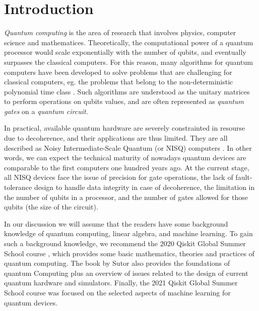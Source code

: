 \section{Introduction} \label{Sec: Introduction}

\emph{Quantum computing} is the area of research that involves physics, computer science and mathematices.
Theoretically, the computational power of a quantum processor would scale exponentially with the number of qubits, and eventually surpasses the classical computers.
For this reason, many algorithms for quantum computers have been developed to solve problems that are challenging for classical computers, eg. the problems that belong to the non-deterministic polynomial time class \cite{williamsSolvingNPCompleteProblems2011,jiangQuantumAnnealingPrime2018,farhiQuantumApproximateOptimization2014}.
Such algorithms are understood as the unitary matrices to perform operations on qubits values, and are often represented as \emph{quantum gates} on a \emph{quantum circuit}.

In practical, available quantum hardware are severely constrainted in resourse due to decoherence, and their applications are thus limited.
They are all described as Noisy Intermediate-Scale Quantum (or NISQ) computers \cite{brooksQuantumSupremacyHunt2019}.
In other words, we can expect the technical maturity of nowadays quantum devices are comparable to the first computers one hundred years ago.
At the current stage, all NISQ devices face the issue of precision for gate operations, the lack of fault-tolerance design to handle data integrity in case of decoherence, the limitation in the number of qubits in a processor, and the number of gates allowed for those qubits (the size of the circuit).

In our discussion we will assume that the readers have some background knowledge of quantum computing, linear algebra, and machine learning.
To gain such a background knowledge, we recommend the 2020 Qiskit Global Summer School course \cite{2020QiskitGlobal}, which provides some basic mathematics, theories and practices of quantum computing.
The book by Sutor \cite{sutorDancingQubitsHow2019} also provides the foundations of quantum Computing plus an overview of issues related to the design of current quantum hardware and simulators.
Finally, the 2021 Qiskit Global Summer School course \cite{2021QiskitGlobal} was focused on the selected aspects of machine learning for quantum devices.